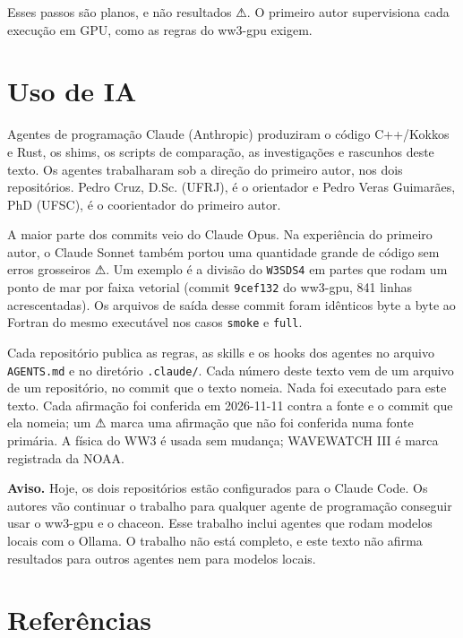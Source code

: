 \documentclass[10pt,a4paper,]{article}
\begin{document}
Esses passos são planos, e não resultados ⚠. O primeiro autor
supervisiona cada execução em GPU, como as regras do ww3-gpu exigem.

\section{Uso de IA}\label{sec:ai}

Agentes de programação Claude (Anthropic) produziram o código C++/Kokkos
e Rust, os shims, os scripts de comparação, as investigações e rascunhos
deste texto. Os agentes trabalharam sob a direção do primeiro autor, nos
dois repositórios. Pedro Cruz, D.Sc. (UFRJ), é o orientador e Pedro
Veras Guimarães, PhD (UFSC), é o coorientador do primeiro autor.

A maior parte dos commits veio do Claude Opus. Na experiência do
primeiro autor, o Claude Sonnet também portou uma quantidade grande de
código sem erros grosseiros ⚠. Um exemplo é a divisão do \texttt{W3SDS4}
em partes que rodam um ponto de mar por faixa vetorial (commit
\texttt{9cef132} do ww3-gpu, 841 linhas acrescentadas). Os arquivos de
saída desse commit foram idênticos byte a byte ao Fortran do mesmo
executável nos casos \texttt{smoke} e \texttt{full}.

Cada repositório publica as regras, as skills e os hooks dos agentes no
arquivo \texttt{AGENTS.md} e no diretório \texttt{.claude/}. Cada número
deste texto vem de um arquivo de um repositório, no commit que o texto
nomeia. Nada foi executado para este texto. Cada afirmação foi conferida
em 2026-11-11 contra a fonte e o commit que ela nomeia; um ⚠ marca uma
afirmação que não foi conferida numa fonte primária. A física do WW3 é
usada sem mudança; WAVEWATCH III é marca registrada da NOAA.

\textbf{Aviso.} Hoje, os dois repositórios estão configurados para o
Claude Code. Os autores vão continuar o trabalho para qualquer agente de
programação conseguir usar o ww3-gpu e o chaceon. Esse trabalho inclui
agentes que rodam modelos locais com o Ollama. O trabalho não está
completo, e este texto não afirma resultados para outros agentes nem
para modelos locais.

\section*{Referências}\label{referuxeancias}
\end{document}
